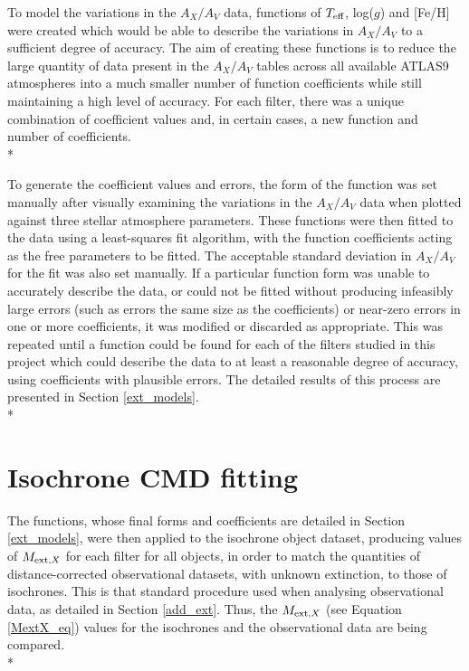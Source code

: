 \documentclass[12pt, a4paper]{report}
\begin{document}
To model the variations in the $A_{X}/A_{V}$ data, functions of $T_{\textnormal{eff}}$, log($g$) and [Fe/H] were created which would be able to describe the variations in $A_{X}/A_{V}$ to a sufficient degree of accuracy. The aim of creating these functions is to reduce the large quantity of data present in the $A_{X}/A_{V}$ tables across all available ATLAS9 atmospheres into a much smaller number of function coefficients while still maintaining a high level of accuracy. For each filter, there was a unique combination of coefficient values and, in certain cases, a new function and number of coefficients.\\*


To generate the coefficient values and errors, the form of the function was set manually after visually examining the variations in the $A_{X}/A_{V}$ data when plotted against three stellar atmosphere parameters. These functions were then fitted to the data using a least-squares fit algorithm, with the function coefficients acting as the free parameters to be fitted. The acceptable standard deviation in $A_{X}/A_{V}$ for the fit was also set manually. If a particular function form was unable to accurately describe the data, or could not be fitted without producing infeasibly large errors (such as errors the same size as the coefficients) or near-zero errors in one or more coefficients, it was modified or discarded as appropriate. This was repeated until a function could be found for each of the filters studied in this project which could  describe the data to at least a reasonable degree of accuracy, using coefficients with plausible errors. The detailed results of this process are presented in Section \ref{ext_models}.\\*

\section{Isochrone CMD fitting} \label{isoc_fit} 

The functions, whose final forms and coefficients are detailed in Section \ref{ext_models}, were then applied to the isochrone object dataset, producing values of $M_{\textnormal{ext},X}$ for each filter for all objects, in order to match the quantities of distance-corrected observational datasets, with unknown extinction, to those of isochrones. This is that standard procedure used when analysing observational data, as detailed in Section \ref{add_ext}. Thus, the $M_{\textnormal{ext},X}$ (see Equation \ref{MextX_eq}) values for the isochrones and the observational data are being compared.\\*
\end{document}
